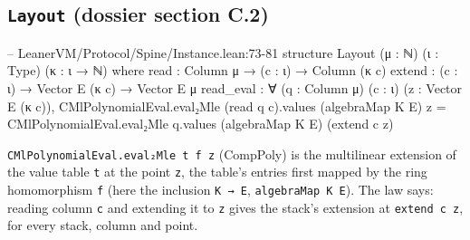 \subsection{\texttt{Layout} (dossier section C.2)}\label{sec:gen-spine-C2}

\begin{leancode}
-- LeanerVM/Protocol/Spine/Instance.lean:73-81
structure Layout (μ : ℕ) (ι : Type) (κ : ι → ℕ) where
  read : Column μ → (c : ι) → Column (κ c)
  extend : (c : ι) → Vector E (κ c) → Vector E μ
  read_eval : ∀ (q : Column μ) (c : ι) (z : Vector E (κ c)),
    CMlPolynomialEval.eval₂Mle (read q c).values (algebraMap K E) z =
      CMlPolynomialEval.eval₂Mle q.values (algebraMap K E) (extend c z)
\end{leancode}

\texttt{C\allowbreak{}M\allowbreak{}l\allowbreak{}P\allowbreak{}o\allowbreak{}l\allowbreak{}y\allowbreak{}n\allowbreak{}o\allowbreak{}m\allowbreak{}i\allowbreak{}a\allowbreak{}l\allowbreak{}E\allowbreak{}v\allowbreak{}a\allowbreak{}l\allowbreak{}.\allowbreak{}e\allowbreak{}v\allowbreak{}a\allowbreak{}l\allowbreak{}₂\allowbreak{}M\allowbreak{}l\allowbreak{}e\allowbreak{} t\allowbreak{} f\allowbreak{} z} (CompPoly) is the multilinear extension of the value table \texttt{t} at the point \texttt{z}, the table's entries first mapped by the ring homomorphism \texttt{f} (here the inclusion \texttt{K → E}, \texttt{algebraMap K E}). The law says: reading column \texttt{c} and extending it to \texttt{z} gives the stack's extension at \texttt{extend c z}, for every stack, column and point.

